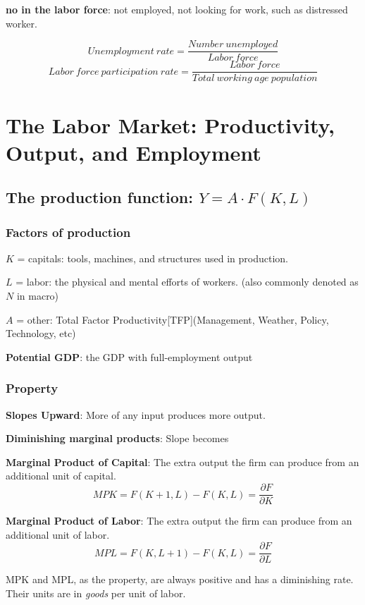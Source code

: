 \documentclass[10pt, a4paper]{article}
\begin{document}
            \textbf{no in the labor force}: not employed, not looking for work, such as distressed worker. 

            $$Unemployment\ rate = \frac{Number\ unemployed}{Labor\ force}$$
            $$Labor\ force\ participation\ rate = \frac{Labor\ force}{Total\ working\ age\ population}$$
    
    \section{The Labor Market: Productivity, Output, and Employment}
        \subsection{The production function: $Y = A\cdot F(K, L)$}
        \subsubsection{Factors of production}
            $K$ = capitals: tools, machines, and structures used in production.
            
            $L$ = labor: the physical and mental efforts of workers. (also commonly denoted as $N$ in macro) 

            $A$ = other: Total Factor Productivity[TFP](Management, Weather, Policy, Technology, etc)
            
            \textbf{Potential GDP}: the GDP with full-employment output
        \subsubsection{Property}
            \textbf{Slopes Upward}: More of any input produces more output. 
            
            \textbf{Diminishing marginal products}: Slope becomes 
            
            \textbf{Marginal Product of Capital}: The extra output the firm can produce from an additional unit of capital. 
            $$MPK = F(K + 1, L) - F(K, L)  = \frac{\partial F}{\partial K}$$
            
            \textbf{Marginal Product of Labor}: The extra output the firm can produce from an additional unit of labor.  
            $$MPL = F(K, L + 1) - F(K, L) = \frac{\partial F}{\partial L}$$

            MPK and MPL, as the property, are always positive and has a diminishing rate. Their units are in \emph{goods} per unit of labor.  
\end{document}
